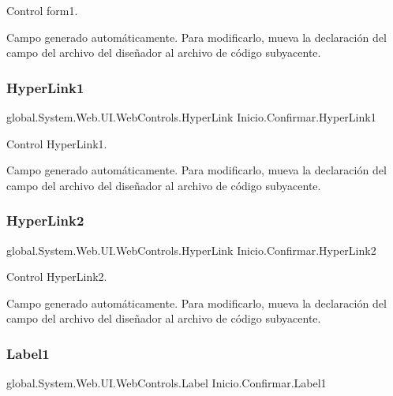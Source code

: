 Control form1. 

Campo generado automáticamente. Para modificarlo, mueva la declaración del campo del archivo del diseñador al archivo de código subyacente. \mbox{\label{class_inicio_1_1_confirmar_aa4a4ab67f1e6964cdc3e83eb66293fa9}} 
\subsubsection{\texorpdfstring{HyperLink1}{HyperLink1}}
{\footnotesize\ttfamily global.\+System.\+Web.\+U\+I.\+Web\+Controls.\+Hyper\+Link Inicio.\+Confirmar.\+Hyper\+Link1\hspace{0.3cm}{\ttfamily [protected]}}



Control Hyper\+Link1. 

Campo generado automáticamente. Para modificarlo, mueva la declaración del campo del archivo del diseñador al archivo de código subyacente. \mbox{\label{class_inicio_1_1_confirmar_adbc12b387c3590f83453888d8192db9a}} 
\subsubsection{\texorpdfstring{HyperLink2}{HyperLink2}}
{\footnotesize\ttfamily global.\+System.\+Web.\+U\+I.\+Web\+Controls.\+Hyper\+Link Inicio.\+Confirmar.\+Hyper\+Link2\hspace{0.3cm}{\ttfamily [protected]}}



Control Hyper\+Link2. 

Campo generado automáticamente. Para modificarlo, mueva la declaración del campo del archivo del diseñador al archivo de código subyacente. \mbox{\label{class_inicio_1_1_confirmar_a0422c86bf977b315fd681b02c0f5f352}} 
\subsubsection{\texorpdfstring{Label1}{Label1}}
{\footnotesize\ttfamily global.\+System.\+Web.\+U\+I.\+Web\+Controls.\+Label Inicio.\+Confirmar.\+Label1\hspace{0.3cm}{\ttfamily [protected]}}



